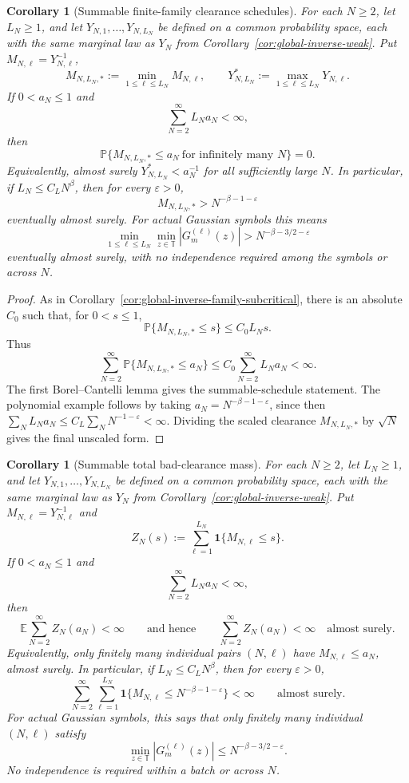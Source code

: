 \documentclass[11pt]{amsart}
\numberwithin{equation}{section}
\newtheorem{corollary}[theorem]{Corollary}
\theoremstyle{definition}
\theoremstyle{remark}
\newcommand{\T}{\mathbb T}
\newcommand{\Prob}{\mathbb P}
\newcommand{\Exp}{\mathbb E}
\newcommand{\eps}{\varepsilon}
\begin{document}
\begin{corollary}[Summable finite-family clearance schedules]
\label{cor:global-inverse-family-borel}
For each \(N\ge2\), let \(L_N\ge1\), and let
\(Y_{N,1},\ldots,Y_{N,L_N}\) be defined on a common probability space, each with
the same marginal law as \(Y_N\) from
Corollary~\ref{cor:global-inverse-weak}.  Put \(M_{N,\ell}=Y_{N,\ell}^{-1}\),
\[
  M_{N,L_N,*}:=\min_{1\le\ell\le L_N}M_{N,\ell},
  \qquad
  Y_{N,L_N}^*:=\max_{1\le\ell\le L_N}Y_{N,\ell}.
\]
If \(0<a_N\le1\) and
\[
  \sum_{N=2}^\infty L_N a_N<\infty,
\]
then
\[
  \Prob\{M_{N,L_N,*}\le a_N\ \text{for infinitely many }N\}=0.
\]
Equivalently, almost surely \(Y_{N,L_N}^*<a_N^{-1}\) for all sufficiently large
\(N\).  In particular, if \(L_N\le C_LN^\beta\), then for every
\(\eps>0\),
\[
  M_{N,L_N,*}>N^{-\beta-1-\eps}
\]
eventually almost surely.  For actual Gaussian symbols this means
\[
  \min_{1\le\ell\le L_N}\min_{z\in\T}|G_m^{(\ell)}(z)|
  > N^{-\beta-3/2-\eps}
\]
eventually almost surely, with no independence required among the symbols or
across \(N\).
\end{corollary}

\begin{proof}
As in Corollary~\ref{cor:global-inverse-family-subcritical}, there is an
absolute \(C_0\) such that, for \(0<s\le1\),
\[
  \Prob\{M_{N,L_N,*}\le s\}\le C_0L_Ns .
\]
Thus
\[
  \sum_{N=2}^\infty
  \Prob\{M_{N,L_N,*}\le a_N\}
  \le
  C_0\sum_{N=2}^\infty L_Na_N
  <\infty .
\]
The first Borel--Cantelli lemma gives the summable-schedule statement.  The
polynomial example follows by taking \(a_N=N^{-\beta-1-\eps}\), since then
\(\sum_N L_Na_N\le C_L\sum_NN^{-1-\eps}<\infty\).  Dividing the scaled
clearance \(M_{N,L_N,*}\) by \(\sqrt N\) gives the final unscaled form.
\end{proof}

\begin{corollary}[Summable total bad-clearance mass]
\label{cor:global-inverse-family-count-sum}
For each \(N\ge2\), let \(L_N\ge1\), and let
\(Y_{N,1},\ldots,Y_{N,L_N}\) be defined on a common probability space, each with
the same marginal law as \(Y_N\) from
Corollary~\ref{cor:global-inverse-weak}.  Put \(M_{N,\ell}=Y_{N,\ell}^{-1}\) and
\[
  Z_N(s):=\sum_{\ell=1}^{L_N}\mathbf1\{M_{N,\ell}\le s\}.
\]
If \(0<a_N\le1\) and
\[
  \sum_{N=2}^\infty L_Na_N<\infty,
\]
then
\[
  \Exp\sum_{N=2}^\infty Z_N(a_N)<\infty
  \qquad\text{and hence}\qquad
  \sum_{N=2}^\infty Z_N(a_N)<\infty
  \quad\text{almost surely}.
\]
Equivalently, only finitely many individual pairs \((N,\ell)\) have
\(M_{N,\ell}\le a_N\), almost surely.  In particular, if
\(L_N\le C_LN^\beta\), then for every \(\eps>0\),
\[
  \sum_{N=2}^\infty
  \sum_{\ell=1}^{L_N}
  \mathbf1\{M_{N,\ell}\le N^{-\beta-1-\eps}\}<\infty
  \qquad\text{almost surely}.
\]
For actual Gaussian symbols, this says that only finitely many individual
\((N,\ell)\) satisfy
\[
  \min_{z\in\T}|G_m^{(\ell)}(z)|
  \le N^{-\beta-3/2-\eps}.
\]
No independence is required within a batch or across \(N\).
\end{corollary}
\end{document}
